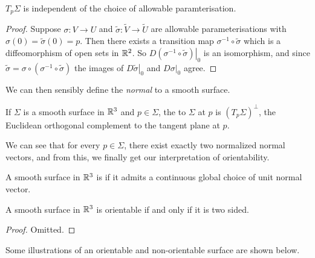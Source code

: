 \documentclass[a4paper]{article}
\begin{document}
\begin{lemma}
$T_p\Sigma$ is independent of the choice of allowable paramterisation.
\end{lemma}
\begin{proof}
    Suppose $\sigma: V \rightarrow U$ and $\tilde \sigma : \tilde V \rightarrow \tilde U$ are allowable parameterisations with $\sigma(0) = \tilde \sigma(0) = p$. Then there exists a transition map $\sigma^{-1} \circ \tilde \sigma$ which is a diffeomorphism of open sets in $\mathbb{R}^2$. So $D\left.(\sigma^{-1} \circ \tilde \sigma) \right|_0$ is an isomorphism, and since $\tilde \sigma = \sigma \circ (\sigma^{-1} \circ \tilde \sigma)$ the images of $\left.D \tilde\sigma\right|_0$ and $\left.D \sigma\right|_0$ agree.
\end{proof}

We can then sensibly define the \emph{normal} to a smooth surface.

\begin{definition}
    If $\Sigma$ is a smooth surface in $\mathbb{R}^3$ and $p \in \Sigma$, the  to $\Sigma$ at $p$ is $(T_p \Sigma)^\perp$, the Euclidean orthogonal complement to the tangent plane at $p$.
\end{definition}

We can see that for every $p \in \Sigma$, there exist exactly two normalized normal vectors, and from this, we finally get our interpretation of orientability.

\begin{definition}
    A smooth surface in $\mathbb{R}^3$ is  if it admits a continuous global choice of unit normal vector.
\end{definition}

\begin{lemma}
    A smooth surface in $\mathbb{R}^3$ is orientable if and only if it is two sided.
\end{lemma}
\begin{proof}
    Omitted.
\end{proof}

Some illustrations of an orientable and non-orientable surface are shown below.
\end{document}
